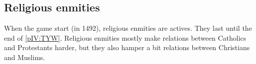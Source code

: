 \subsection{Religious enmities}

\aparag When the game start (in 1492), religious enmities are actives. They
last until the end of \ref{pIV:TYW}.
\bparag Religious enmities mostly make relations between Catholics and
Protestants harder, but they also hamper a bit relations between Christians
and Muslims.







